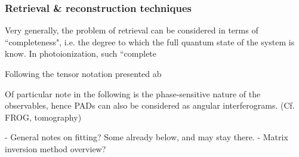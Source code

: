 \subsubsection{Retrieval \& reconstruction techniques}

Very generally, the problem of retrieval can be considered in terms of ``completeness", i.e. the degree to which the full quantum state of the system is know. In photoionization, such ``complete

Following the tensor notation presented ab

Of particular note in the following is the phase-sensitive nature of the observables, hence PADs can also be considered as angular interferograms. (Cf. FROG, tomography)

- General notes on fitting? Some already below, and may stay there.
- Matrix inversion method overview?